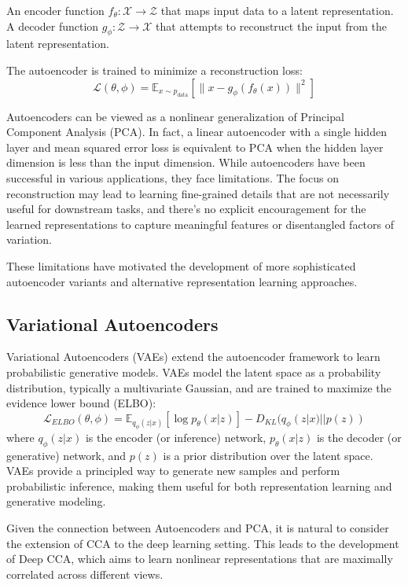 An encoder function $f_{\theta}: \mathcal{X} \to \mathcal{Z}$ that maps input data to a latent representation.
A decoder function $g_{\phi}: \mathcal{Z} \to \mathcal{X}$ that attempts to reconstruct the input from the latent representation.

The autoencoder is trained to minimize a reconstruction loss:
\begin{equation}
\mathcal{L}(\theta, \phi) = \mathbb{E}_{x \sim p_{\text{data}}}[\|x - g_{\phi}(f_{\theta}(x))\|^2]
\end{equation}

Autoencoders can be viewed as a nonlinear generalization of Principal Component Analysis (PCA). In fact, a linear autoencoder with a single hidden layer and mean squared error loss is equivalent to PCA when the hidden layer dimension is less than the input dimension.
While autoencoders have been successful in various applications, they face limitations. The focus on reconstruction may lead to learning fine-grained details that are not necessarily useful for downstream tasks, and there's no explicit encouragement for the learned representations to capture meaningful features or disentangled factors of variation.

These limitations have motivated the development of more sophisticated autoencoder variants and alternative representation learning approaches.
\subsection{Variational Autoencoders}
Variational Autoencoders (VAEs) \citep{kingma2013auto} extend the autoencoder framework to learn probabilistic generative models. VAEs model the latent space as a probability distribution, typically a multivariate Gaussian, and are trained to maximize the evidence lower bound (ELBO):
\begin{equation}
\mathcal{L}_{ELBO}(\theta, \phi) = \mathbb{E}_{q_{\phi}(z|x)}[\log p_{\theta}(x|z)] - D_{KL}(q_{\phi}(z|x) || p(z))
\end{equation}
where $q_{\phi}(z|x)$ is the encoder (or inference) network, $p_{\theta}(x|z)$ is the decoder (or generative) network, and $p(z)$ is a prior distribution over the latent space.
VAEs provide a principled way to generate new samples and perform probabilistic inference, making them useful for both representation learning and generative modeling.

Given the connection between Autoencoders and PCA, it is natural to consider the extension of CCA to the deep learning setting. This leads to the development of Deep CCA, which aims to learn nonlinear representations that are maximally correlated across different views.

